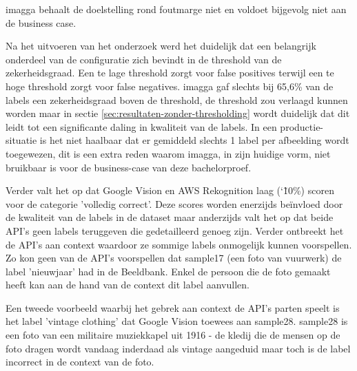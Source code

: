 imagga behaalt de doelstelling rond foutmarge niet en voldoet bijgevolg niet aan de business case.

Na het uitvoeren van het onderzoek werd het duidelijk dat een belangrijk onderdeel van de configuratie zich bevindt in de threshold van de zekerheidsgraad. Een te lage threshold zorgt voor false positives terwijl een te hoge threshold zorgt voor false negatives. imagga gaf slechts bij 65,6\% van de labels een zekerheidsgraad boven de threshold, de threshold zou verlaagd kunnen worden maar in sectie \ref{sec:resultaten-zonder-thresholding} wordt duidelijk dat dit leidt tot een significante daling in kwaliteit van de labels. In een productie-situatie is het niet haalbaar dat er gemiddeld slechts 1 label per afbeelding wordt toegewezen, dit is een extra reden waarom imagga, in zijn huidige vorm, niet bruikbaar is voor de business-case van deze bachelorproef. 

Verder valt het op dat Google Vision en AWS Rekognition laag (\char`\~ 10\%) scoren voor de categorie 'volledig correct'. Deze scores worden enerzijds beïnvloed door de kwaliteit van de labels in de dataset maar anderzijds valt het op dat beide API's geen labels teruggeven die gedetailleerd genoeg zijn. Verder ontbreekt het de API's aan context waardoor ze sommige labels onmogelijk kunnen voorspellen. 
Zo kon geen van de API's voorspellen dat sample17 (een foto van vuurwerk) de label 'nieuwjaar' had in de Beeldbank.  Enkel de persoon die de foto gemaakt heeft kan aan de hand van de context dit label aanvullen.

Een tweede voorbeeld waarbij het gebrek aan context de API's parten speelt is het label 'vintage clothing' dat Google Vision toewees aan sample28. sample28 is een foto van een militaire muziekkapel uit 1916 - de kledij die de mensen op de foto dragen wordt vandaag inderdaad als vintage aangeduid maar toch is de label incorrect in de context van de foto.